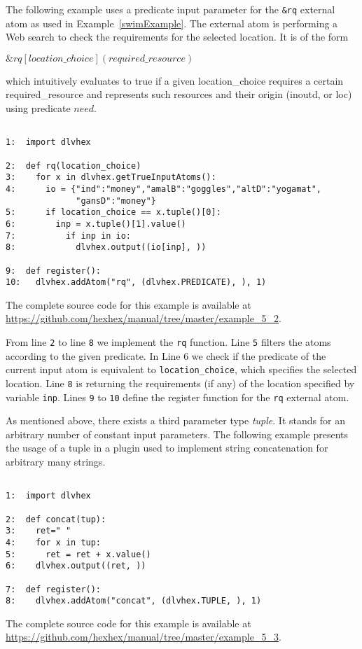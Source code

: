 \documentclass[a4paper, titlepage]{article}
\newcommand{\ext}[3]{\ensuremath{\&{#1}[#2](#3)}}
\newcommand{\examplelink}[1]{\url{https://github.com/hexhex/manual/tree/master/#1}}
\newcommand\mycenterline[1]{\par\smallskip\centerline{#1} \smallskip}
\begin{document}
The following example uses a predicate input parameter 
for the \verb+&rq+ external atom as used in Example~\ref{swimExample}. The external atom is performing 
a Web search to check the requirements for the selected location. It is of the form 
%
\mycenterline{$\ext{\mathit{rq}}{\mathit{location\_choice}}
{\mathit{required\_resource}}$}
% 
which intuitively evaluates 
to true if a given location\_choice requires a certain 
required\_resource and represents such resources and their 
origin (inoutd, or loc) using predicate $\mathit{need}$. 
\begin{exmp}
\label{predicateAsInput}
\begin{verbatim}

1:  import dlvhex 

2:  def rq(location_choice)
3:    for x in dlvhex.getTrueInputAtoms():
4:      io = {"ind":"money","amalB":"goggles","altD":"yogamat",
              "gansD":"money"}
5:      if location_choice == x.tuple()[0]:
6:        inp = x.tuple()[1].value()
7:          if inp in io:
8:            dlvhex.output((io[inp], ))

9:  def register():
10:   dlvhex.addAtom("rq", (dlvhex.PREDICATE), ), 1)
\end{verbatim}
\end{exmp}
The complete source code for this example is available at \examplelink{example_5_2}.

From line \verb+2+ to line \verb+8+ we implement the \verb+rq+ function. Line \verb+5+ filters the atoms according to the given predicate. In Line 6 we check if the predicate of the current input atom is equivalent to \texttt{location\_choice}, which specifies the selected location. Line \verb+8+ is returning  
the requirements (if any) of the location specified by variable 
\verb+inp+. Lines \verb+9+ to \verb+10+ define the register 
function for the \verb+rq+ external atom.

As mentioned above, there exists a third parameter type \emph{tuple}. It stands for an arbitrary number of constant input parameters. The following example presents the usage of a tuple in a plugin used to implement string concatenation for arbitrary many strings.  
\begin{exmp}
\label{tupleAsInput}
\begin{verbatim}

1:  import dlvhex

2:  def concat(tup):
3:    ret=" "
4:    for x in tup:
5:      ret = ret + x.value()
6:    dlvhex.output((ret, ))

7:  def register():
8:    dlvhex.addAtom("concat", (dlvhex.TUPLE, ), 1)
\end{verbatim}
\end{exmp}
The complete source code for this example is available at \examplelink{example_5_3}.
\end{document}
